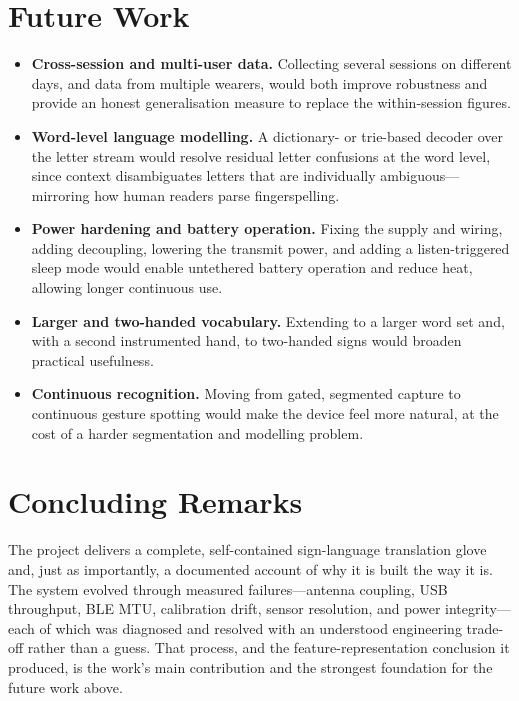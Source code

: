 \section{Future Work}

\begin{itemize}
    \item \textbf{Cross-session and multi-user data.} Collecting several
    sessions on different days, and data from multiple wearers, would both
    improve robustness and provide an honest generalisation measure to replace
    the within-session figures.
    \item \textbf{Word-level language modelling.} A dictionary- or trie-based
    decoder over the letter stream would resolve residual letter confusions at
    the word level, since context disambiguates letters that are individually
    ambiguous—mirroring how human readers parse fingerspelling.
    \item \textbf{Power hardening and battery operation.} Fixing the supply and
    wiring, adding decoupling, lowering the transmit power, and adding a
    listen-triggered sleep mode would enable untethered battery operation and
    reduce heat, allowing longer continuous use.
    \item \textbf{Larger and two-handed vocabulary.} Extending to a larger word
    set and, with a second instrumented hand, to two-handed signs would broaden
    practical usefulness.
    \item \textbf{Continuous recognition.} Moving from gated, segmented capture
    to continuous gesture spotting would make the device feel more natural,
    at the cost of a harder segmentation and modelling problem.
\end{itemize}

\section{Concluding Remarks}

The project delivers a complete, self-contained sign-language translation glove
and, just as importantly, a documented account of why it is built the way it
is. The system evolved through measured failures—antenna coupling, USB
throughput, BLE MTU, calibration drift, sensor resolution, and power
integrity—each of which was diagnosed and resolved with an understood
engineering trade-off rather than a guess. That process, and the
feature-representation conclusion it produced, is the work's main contribution
and the strongest foundation for the future work above.
